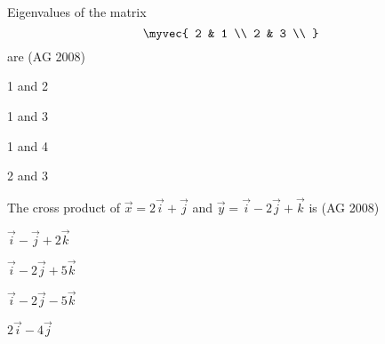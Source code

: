 \item 
 Eigenvalues of the matrix
 $$\myvec{ 
 2 & 1 \\
 2 & 3 \\
 }$$
 are 
\hfill(AG 2008)
\begin{enumerate}
\begin{multicols}{4}
\item 1 and 2
\item 1 and 3
\item 1 and 4
\item 2 and 3 
\end{multicols}
\end{enumerate}
\item 
 The cross product of $\vec{x} = 2\vec{i}+\vec{j}$ and $\vec{y} = \vec{i}-2\vec{j}+\vec{k}$ is 
\hfill(AG 2008)
\begin{enumerate}
\begin{multicols}{2}
\item  $\vec{i}-\vec{j}+2\vec{k}$
\item  $\vec{i}-2\vec{j}+5\vec{k}$
\item  $\vec{i}-2\vec{j}-5\vec{k}$
\item  $2\vec{i}-4\vec{j}$
\end{multicols}
\end{enumerate}

